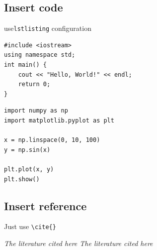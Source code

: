 \documentclass[12pt,hyperref,a4paper,UTF8]{article}
\begin{document}
\subsection{Insert code}
use\verb|lstlisting| configuration
\begin{lstlisting}[style=CPP, title="c++ code"]
#include <iostream>
using namespace std;
int main() {
    cout << "Hello, World!" << endl;
    return 0;
}

\end{lstlisting}

\begin{lstlisting}[style=Python, title="Python code"]
import numpy as np
import matplotlib.pyplot as plt

x = np.linspace(0, 10, 100)
y = np.sin(x)

plt.plot(x, y)
plt.show()
\end{lstlisting}

\subsection{Insert reference}

Just use \verb|\cite{}|

   \textit{ The literature cited here  \cite{liu2023backdoor}  The literature cited here \cite{du2024sequential} }


\end{document}
